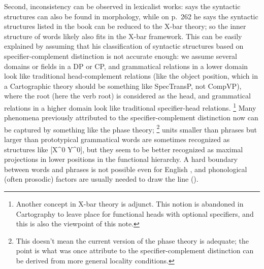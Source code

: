 \documentclass[UTF8, a4paper, oneside, scheme=plain, 12pt]{ctexrep}
\newcommand*{\citepage}[1]{p.~{#1}}
\newcommand*{\citepages}[1]{pp.~{#1}}
\begin{document}
{Second, inconsistency can be observed in lexicalist works:
\citet[\citepages{242}]{deng2010formal} says the syntactic structures 
can also be found in morphology,
while on \citepage{262} he says 
the syntactic structures listed in the book 
can be reduced to the X-bar theory;
so the inner structure of words likely
also fits in the X-bar framework.
This can be easily explained by assuming that his classification of syntactic structures 
based on specifier-complement distinction is not accurate enough:
we assume several domains or fields in a DP or CP,
and grammatical relations in a lower domain look like 
traditional head-complement relations (like the object position, 
which in a Cartographic theory should be something like SpecTransP, 
not CompVP),
where the root (here the verb root) is considered as the head,
and grammatical relations in a higher domain look like  
traditional specifier-head relations.%
\footnote{
    Another concept in X-bar theory is adjunct.
    This notion is abandoned in Cartography 
    to leave place for functional heads with optional specifiers, 
    and this is also the viewpoint of this note.
}
Many phenomena previously attributed to the specifier-complement distinction 
now can be captured by something like the phase theory;%
\footnote{
    This doesn't mean the current version of the phase theory 
    is adequate; the point is what was once attribute to the specifier-complement distinction
    can be derived from more general locality conditions. 
}
units smaller than phrases 
but larger than prototypical grammatical words 
are sometimes recognized as structures like [X^0 Y^0],
but they seem to be better recognized as 
maximal projections in lower positions in the functional hierarchy.
A hard boundary between words and phrases 
is not possible even for English \citep{bruening2018lexicalist},
and phonological (often prosodic) factors are usually needed to draw the line 
().

}
\end{document}
